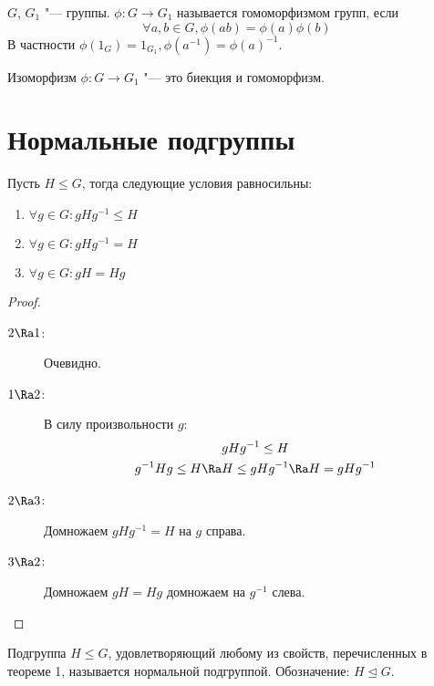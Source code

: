 \begin{Def}
	$G$, $G_1$ "--- группы.
	$\phi \colon G \to G_1$ называется гомоморфизмом групп, если
	\[ \forall a, b \in G, \phi(ab) = \phi(a) \phi(b) \]
	В частности $\phi(1_G) = 1_{G_1}, \phi(a^{-1}) = \phi(a)^{-1}$.
\end{Def}
\begin{Def}
	Изоморфизм $\phi\colon G \to G_1$ "--- это биекция и гомоморфизм.
\end{Def}

\section{Нормальные подгруппы}

\begin{theorem}
	Пусть $H \le G$, тогда следующие условия равносильны:
	\begin{enumerate}
		\item $\forall g \in G \colon gHg^{-1} \le H$
		\item $\forall g \in G \colon gHg^{-1} = H$
		\item $\forall g \in G \colon gH = Hg$
	\end{enumerate}
\end{theorem}
\begin{proof}\begin{description}
\item[$2 \Ra 1$:]
	Очевидно.

\item[$1 \Ra 2$:]
	В силу произвольности $g$:
	\begin{gather*}
		gHg^{-1} \le H \\
		g^{-1}Hg \le H \Ra H \le gHg^{-1} \Ra H = gHg^{-1}
	\end{gather*}

\item[$2 \Ra 3$:]
	Домножаем $gHg^{-1} = H$ на $g$ справа.

\item[$3 \Ra 2$:]
	Домножаем $gH = Hg$ домножаем на $g^{-1}$ слева.
\end{description}\end{proof}

\begin{Def}
	Подгруппа $H \le G$, удовлетворяющий любому из свойств, перечисленных в теореме 1, называется нормальной подгруппой.
	Обозначение: $H \unlhd G$.
\end{Def}

